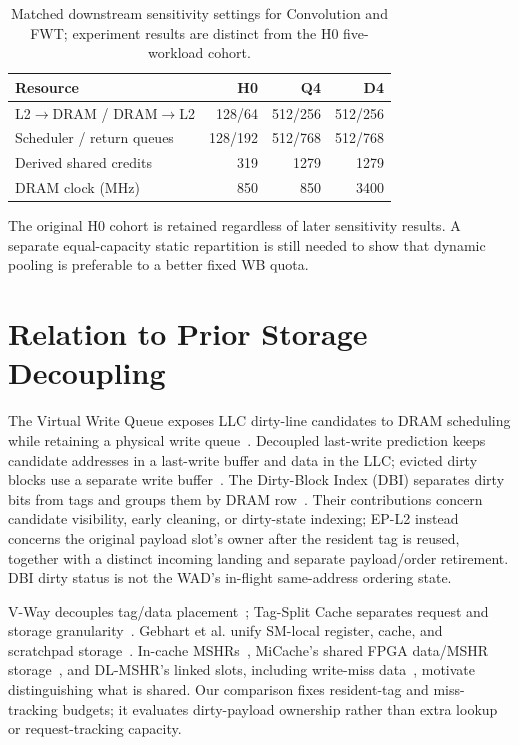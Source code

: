 \documentclass[conference,letterpaper]{IEEEtran}
\begin{document}
\begin{table}[t]
\caption{Matched downstream sensitivity settings for Convolution and FWT; experiment results are distinct from the H0 five-workload cohort.}
\label{tab:headroom}\centering\footnotesize
\begin{tabular}{@{}lrrr@{}}
\toprule
Resource & H0 & Q4 & D4 \\
\midrule
L2$\to$DRAM / DRAM$\to$L2 & 128/64 & 512/256 & 512/256 \\
Scheduler / return queues & 128/192 & 512/768 & 512/768 \\
Derived shared credits & 319 & 1279 & 1279 \\
DRAM clock (MHz) & 850 & 850 & 3400 \\
\bottomrule
\end{tabular}
\end{table}

The original H0 cohort is retained regardless of later sensitivity results. A separate equal-capacity static repartition is still needed to show that dynamic pooling is preferable to a better fixed WB quota.

\section{Relation to Prior Storage Decoupling}
The Virtual Write Queue exposes LLC dirty-line candidates to DRAM scheduling while retaining a physical write queue~\cite{vwq}. Decoupled last-write prediction keeps candidate addresses in a last-write buffer and data in the LLC; evicted dirty blocks use a separate write buffer~\cite{lastwrite}. The Dirty-Block Index (DBI) separates dirty bits from tags and groups them by DRAM row~\cite{dbi}. Their contributions concern candidate visibility, early cleaning, or dirty-state indexing; EP-L2 instead concerns the original payload slot's owner after the resident tag is reused, together with a distinct incoming landing and separate payload/order retirement. DBI dirty status is not the WAD's in-flight same-address ordering state.

V-Way decouples tag/data placement~\cite{vway}; Tag-Split Cache separates request and storage granularity~\cite{tsc}. Gebhart et al. unify SM-local register, cache, and scratchpad storage~\cite{unified}. In-cache MSHRs~\cite{farkas}, MiCache's shared FPGA data/MSHR storage~\cite{micache}, and DL-MSHR's linked slots, including write-miss data~\cite{dlmshr}, motivate distinguishing what is shared. Our comparison fixes resident-tag and miss-tracking budgets; it evaluates dirty-payload ownership rather than extra lookup or request-tracking capacity.
\end{document}
